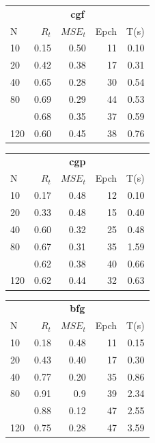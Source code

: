\documentclass[a4paper, 10pt]{article}
\begin{document}
\begin{table}[h!]
\begin{tabular}{@{}lrrrr@{}}
      \toprule
      \multicolumn{5}{c}{\textbf{cgf}} \\
      N  &   $R_t$  &  $MSE_t$ &  Epch  & T(s)\\
      \midrule
      10  & 0.15    & 0.50    & 11      &  0.10  \\
      20  & 0.42    & 0.38    & 17      &  0.31  \\
      40  & 0.65    & 0.28    & 30      &  0.54  \\
      80  & 0.69    & 0.29    & 44      &  0.53  \\
      \hdashline
     100  & 0.68    & 0.35    & 37      &  0.59  \\
     120  & 0.60    & 0.45    & 38      &  0.76  \\
      \bottomrule
    \end{tabular} 
    \mbox{}
    \begin{tabular}{@{}lrrrr@{}}
      \toprule
      \multicolumn{5}{c}{\textbf{cgp}} \\
      N  &   $R_t$  &  $MSE_t$ &  Epch  & T(s)\\
      \midrule
      10  & 0.17    & 0.48    & 12      &  0.10  \\
      20  & 0.33    & 0.48    & 15      &  0.40  \\
      40  & 0.60    & 0.32    & 25      &  0.48  \\
      80  & 0.67    & 0.31    & 35      &  1.59  \\
      \hdashline
     100  & 0.62    & 0.38    & 40      &  0.66  \\
     120  & 0.62    & 0.44    & 32      &  0.63  \\
      \bottomrule
    \end{tabular} 
    \hfill
    \begin{tabular}{@{}lrrrr@{}}
      \toprule
      \multicolumn{5}{c}{\textbf{bfg}} \\
      N  &   $R_t$  &  $MSE_t$ &  Epch  & T(s)\\
      \midrule
      10  & 0.18    & 0.48   & 11       & 0.15  \\
      20  & 0.43    & 0.40   & 17       & 0.30  \\
      40  & 0.77    & 0.20   & 35       & 0.86  \\
      80  & 0.91    & 0.9    & 39       & 2.34  \\
      \hdashline
     100  & 0.88    & 0.12   & 47       & 2.55  \\   
     120  & 0.75    & 0.28   & 47       & 3.59  \\

\end{tabular}
\end{table}
\end{document}

